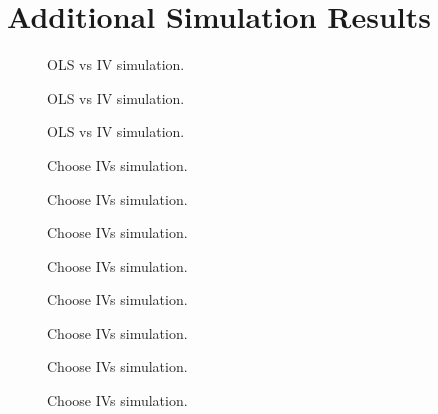 \section{Additional Simulation Results}

\begin{figure}
\centering
	
	\caption{OLS vs IV simulation.}
\end{figure}

\begin{figure}
\centering
	
	\caption{OLS vs IV simulation.}
\end{figure}

\begin{figure}
\centering
	
	\caption{OLS vs IV simulation.}
\end{figure}


\begin{figure}
\centering
	
	\caption{Choose IVs simulation.}
\end{figure}

\begin{figure}
\centering
	
	\caption{Choose IVs simulation.}
\end{figure}

\begin{figure}
\centering
	
	\caption{Choose IVs simulation.}
\end{figure}

\begin{figure}
\centering
	
	\caption{Choose IVs simulation.}
\end{figure}

\begin{figure}
\centering
	
	\caption{Choose IVs simulation.}
\end{figure}

\begin{figure}
\centering
	
	\caption{Choose IVs simulation.}
\end{figure}

\begin{figure}
\centering
	
	\caption{Choose IVs simulation.}
\end{figure}

\begin{figure}
\centering
	
	\caption{Choose IVs simulation.}
\end{figure}

